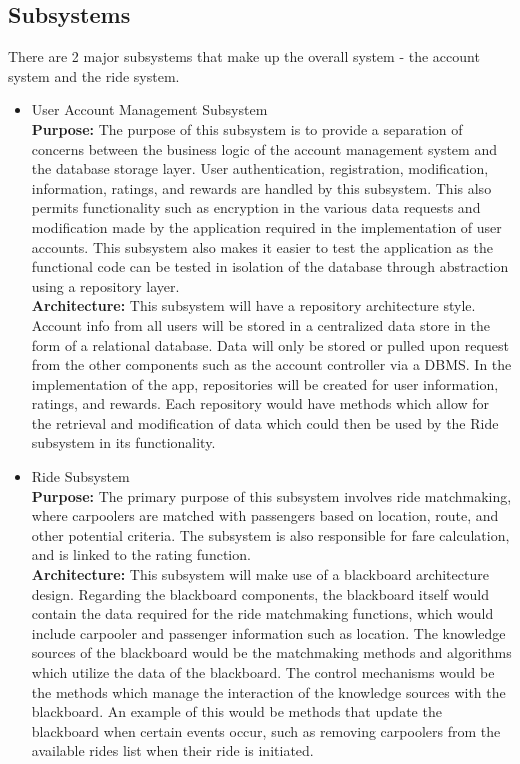 \documentclass[]{article}
\begin{document}

\subsection{Subsystems}
\label{sub:subsystems}

There are 2 major subsystems that make up the overall system - the account system and the ride system.

\begin{itemize}
    \item User Account Management Subsystem \\
    \textbf{Purpose:} The purpose of this subsystem is to provide a separation of concerns between the business logic of the account management system and the database storage layer. User authentication, registration, modification, information, ratings, and rewards are handled by this subsystem. This also permits functionality such as encryption in the various data requests and modification made by the application required in the implementation of user accounts. This subsystem also makes it easier to test the application as the functional code can be tested in isolation of the database through abstraction using a repository layer. \\
    \textbf{Architecture:} This subsystem will have a repository architecture style. Account info from all users will be stored in a centralized data store in the form of a relational database. Data will only be stored or pulled upon request from the other components such as the account controller via a DBMS. In the implementation of the app, repositories will be created for user information, ratings, and rewards. Each repository would have methods which allow for the retrieval and modification of data which could then be used by the Ride subsystem in its functionality. 
\end{itemize}

\begin{itemize}
    \item Ride Subsystem \\
    \textbf{Purpose:} The primary purpose of this subsystem involves ride matchmaking, where carpoolers are matched with passengers based on location, route, and other potential criteria. The subsystem is also responsible for fare calculation, and is linked to the rating function. \\
    \textbf{Architecture:} This subsystem will make use of a blackboard architecture design. Regarding the blackboard components, the blackboard itself would contain the data required for the ride matchmaking functions, which would include carpooler and passenger information such as location. The knowledge sources of the blackboard would be the matchmaking methods and algorithms which utilize the data of the blackboard. The control mechanisms would be the methods which manage the interaction of the knowledge sources with the blackboard. An example of this would be methods that update the blackboard when certain events occur, such as removing carpoolers from the available rides list when their ride is initiated. 
\end{itemize}
\end{document}

